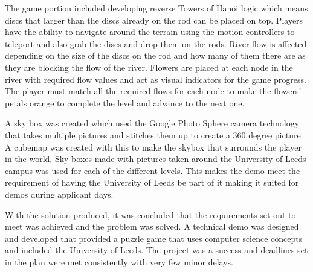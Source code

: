 \newline
\par
The game portion included developing reverse Towers of Hanoi logic which means discs that larger than the discs already on the rod can be placed on top. Players have the ability to navigate around the terrain using the motion controllers to teleport and also grab the discs and drop them on the rods. River flow is affected depending on the size of the discs on the rod and how many of them there are as they are blocking the flow of the river. Flowers are placed at each node in the river with required flow values and act as visual indicators for the game progress. The player must match all the required flows for each node to make the flowers' petals orange to complete the level and advance to the next one.
\newline
\par
A sky box was created which used the Google Photo Sphere camera technology that takes multiple pictures and stitches them up to create a 360 degree picture. A cubemap was created with this to make the skybox that surrounds the player in the world. Sky boxes made with pictures taken around the University of Leeds campus was used for each of the different levels. This makes the demo meet the requirement of having the University of Leeds be part of it making it suited for demos during applicant days.
\newline
\par
With the solution produced, it was concluded that the requirements set out to meet was achieved and the problem was solved. A technical demo was designed and developed that provided a puzzle game that uses computer science concepts and included the University of Leeds. The project was a success and deadlines set in the plan were met consistently with very few minor delays.

